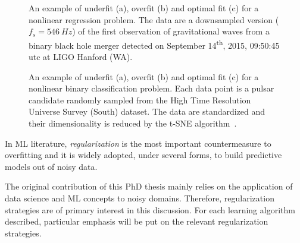 	  \begin{figure}[!h]
	  	\centering
	      \hfill%
	  	\caption{An example of underfit (a), overfit (b) and optimal fit (c) for a nonlinear regression problem. The data are a downsampled version ($f_s = 546~Hz$) of the first observation of gravitational waves from a binary black hole merger detected on September 14\textsuperscript{th}, 2015, 09:50:45 {\sc utc} at LIGO Hanford (WA).}\label{fig:regression_fit}
	  \end{figure}

	  \begin{figure}[!h]
			\centering
			\hfill%
			\caption{An example of underfit (a), overfit (b) and optimal fit (c) for a nonlinear binary classification problem. Each data point is a pulsar candidate randomly sampled from the High Time Resolution Universe Survey (South) dataset. The data are standardized and their dimensionality is reduced by the t-SNE algorithm~\cite{van2008visualizing}. }\label{fig:classification_fit}
	  \end{figure}


      In ML literature, \textit{regularization} is the most important countermeasure to overfitting and it is widely adopted, under several forms, to build predictive models out of noisy data.

	    The original contribution of this PhD thesis mainly relies on the application of data science and ML concepts to noisy domains. Therefore, regularization strategies are of primary interest in this discussion.
	    For each learning algorithm described, particular emphasis will be put on the relevant regularization strategies.

